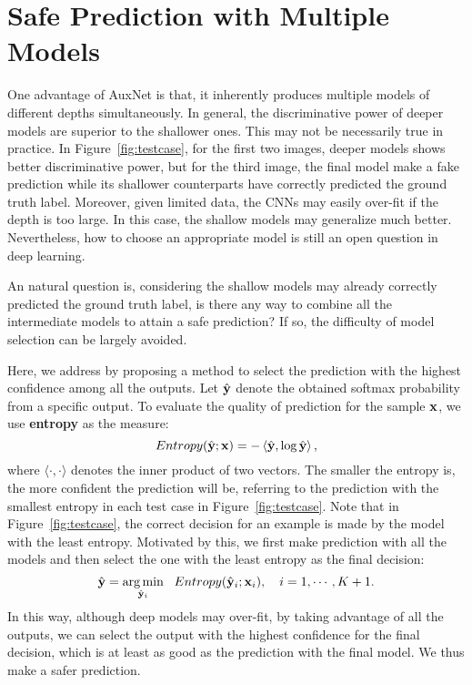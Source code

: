 \documentclass[10pt,onecolumn,letterpaper]{article}
\def\bx{{\bf x}}
\def\by{{\bf y}}
\begin{document}
\section{Safe Prediction with Multiple  Models}\label{sec:safe}
One advantage of AuxNet is that, it inherently produces multiple models of different depths simultaneously.
In general, the discriminative power of deeper models are superior to the shallower ones.  This may not be necessarily true in practice. In Figure~\ref{fig:testcase}, for the first two images, deeper models shows better discriminative power, but for the third image, the final model make a fake prediction while its shallower counterparts have correctly predicted the ground truth label. Moreover, given limited data, the CNNs may easily over-fit if the depth is too large. In this case, the shallow models may generalize much better. Nevertheless, how to choose an appropriate model is still an open question in deep learning.

An natural question is, considering the shallow models may already correctly predicted the ground truth label, is there any way to combine all the intermediate models to attain a safe prediction? If so, the difficulty of model selection can be largely avoided.


Here, we address by proposing a method to select the prediction with the highest confidence among all the outputs.
Let $\hat{\by}$ denote the obtained softmax probability from a specific output.  To evaluate the quality of prediction for the sample $\bx$, we use \textbf{entropy} as the measure:
\begin{equation}
Entropy({\hat \by}; \bx) =  - \left\langle {\hat \by,\log \hat \by} \right\rangle ,
\end{equation}
where $\langle \cdot, \cdot\rangle$ denotes the inner product of two vectors. The smaller the entropy is, the more confident the prediction will be, referring to the prediction with the smallest entropy in each test case in Figure~\ref{fig:testcase}. Note that in Figure~\ref{fig:testcase}, the correct decision for an example is made by the model with the least entropy. Motivated by this, we first make prediction with all the models and then select the one with the least entropy as the final decision:
\begin{equation}
\hat \by = \mathop {\arg \min }\limits_{{\hat \by_i}} ~~Entropy({\hat \by_i};{\bx_i}), ~~~ i=1, \cdots, K+1.
\end{equation}
In this way, although deep models may over-fit, by taking advantage of all the outputs, we can select the output with the highest confidence for the final decision, which is at least as good as the prediction with the final model. We thus make a safer prediction.
\end{document}
